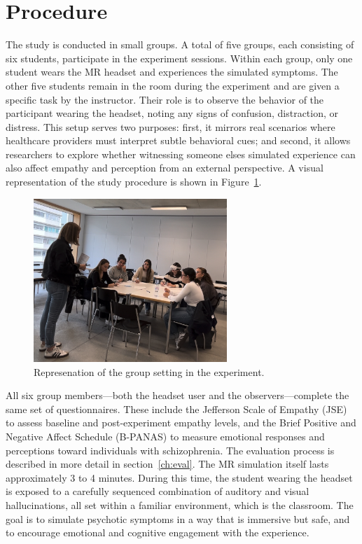 \section{Procedure}

The study is conducted in small groups. A total of five groups, each consisting of six students, participate in the experiment sessions. Within each group, only one student wears the MR headset and experiences the simulated symptoms. The other five students remain in the room during the experiment and are given a specific task by the instructor. Their role is to observe the behavior of the participant wearing the headset, noting any signs of confusion, distraction, or distress. This setup serves two purposes: first, it mirrors real scenarios where healthcare providers must interpret subtle behavioral cues; and second, it allows researchers to explore whether witnessing someone elses simulated experience can also affect empathy and perception from an external perspective. A visual representation of the study procedure is shown in Figure~\ref{fig:group-setting}.

\begin{figure}[htbp]
    \centering
    \includegraphics[width=0.65\textwidth]{../../Figures/Group-setting-02.jpg}
    \caption{Represenation of the group setting in the experiment.}
    \label{fig:group-setting}
\end{figure}

\vspace{1em}

All six group members—both the headset user and the observers—complete the same set of questionnaires. These include the Jefferson Scale of Empathy (JSE) \cite{Hojat2002} to assess baseline and post-experiment empathy levels, and the Brief Positive and Negative Affect Schedule (B-PANAS) \cite{Boiroux2024} to measure emotional responses and perceptions toward individuals with schizophrenia. The evaluation process is described in more detail in section~\ref{ch:eval}. The MR simulation itself lasts approximately 3 to 4 minutes. During this time, the student wearing the headset is exposed to a carefully sequenced combination of auditory and visual hallucinations, all set within a familiar environment, which is the classroom. The goal is to simulate psychotic symptoms in a way that is immersive but safe, and to encourage emotional and cognitive engagement with the experience.


